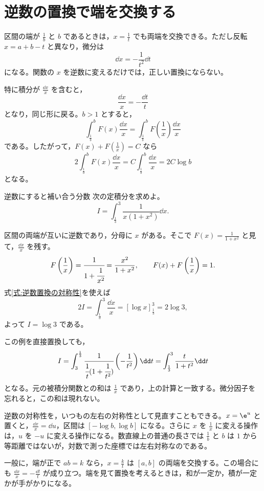 \section{逆数の置換で端を交換する}\label{節:逆数対称性}

区間の端が $\frac1b$ と $b$ であるときは，$x=\frac1t$ でも両端を交換できる。ただし反転 $x=a+b-t$ と異なり，微分は
\[
\dd x=-\frac{1}{t^2}\dd t
\]
になる。関数の $x$ を逆数に変えるだけでは，正しい置換にならない。

特に積分が $\frac{\dd x}{x}$ を含むと，
\[
\frac{\dd x}{x}=-\frac{\dd t}{t}
\]
となり，同じ形に戻る。$b>1$ とすると，
\begin{equation}\label{式:逆数置換の対称性}
\int_{\frac1b}^b F(x)\frac{\dd x}{x}
 =\int_{\frac1b}^b F\left(\frac1x\right)\frac{\dd x}{x}
\end{equation}
である。したがって，$F(x)+F(\frac1x)=C$ なら
\[
2\int_{\frac1b}^b F(x)\frac{\dd x}{x}
 =C\int_{\frac1b}^b\frac{\dd x}{x}
 =2C\log b
\]
となる。

\begin{example}{逆数にすると補い合う分数}
次の定積分を求めよ。
\[
I=\int_{\frac13}^3\frac{1}{x(1+x^2)}\dd x.
\]
\end{example}

区間の両端が互いに逆数であり，分母に $x$ がある。そこで $F(x)=\frac{1}{1+x^2}$ と見て，$\frac{\dd x}{x}$ を残す。
\[
F\left(\frac1x\right)=\cfrac{1}{1+\cfrac{1}{x^2}}
 =\frac{x^2}{1+x^2},
\qquad F(x)+F\left(\frac1x\right)=1.
\]
式\eqref{式:逆数置換の対称性}を使えば
\[
2I=\int_{\frac13}^3\frac{\dd x}{x}
 =\left[\log x\right]_{\frac13}^3=2\log3,
\]
よって $I=\log3$ である。

この例を直接置換しても，
\[
I=\int_3^{\frac13}
\cfrac{1}{\cfrac1t(1+\cfrac1{t^2})}
\left(-\frac{1}{t^2}\right)\dd t
=\int_{\frac13}^3\frac{t}{1+t^2}\dd t
\]
となる。元の被積分関数との和は $\frac1x$ であり，上の計算と一致する。微分因子を忘れると，この和は現れない。

逆数の対称性を，いつもの左右の対称性として見直すこともできる。$x=\e^u$ と置くと，$\frac{\dd x}{x}=\dd u$，区間は $[-\log b,\log b]$ になる。さらに $x$ を $\frac1x$ に変える操作は，$u$ を $-u$ に変える操作になる。数直線上の普通の長さでは $\frac1b$ と $b$ は $1$ から等距離ではないが，対数で測った座標では左右対称なのである。

一般に，端が正で $ab=k$ なら，$x=\frac{k}{t}$ は $[a,b]$ の両端を交換する。この場合にも $\frac{\dd x}{x}=-\frac{\dd t}{t}$ が成り立つ。端を見て置換を考えるときは，和が一定か，積が一定かが手がかりになる。

